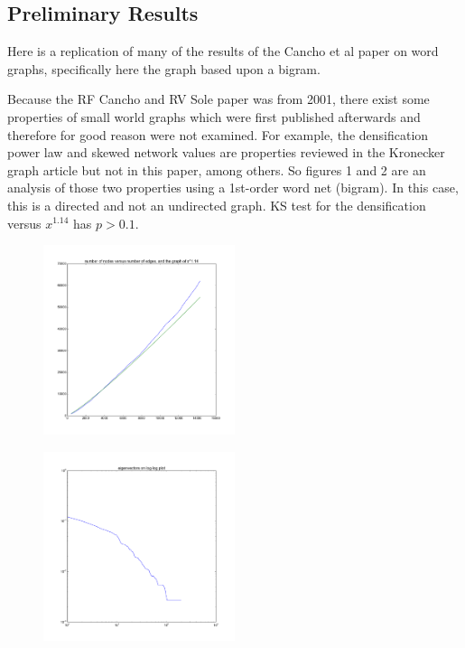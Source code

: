 \documentclass[12pt]{article}
\begin{document}
\subsection{Preliminary Results}

Here is a replication of many of the results of the Cancho et al paper on word graphs, specifically here the graph based upon a bigram. %

Because the RF Cancho and RV Sole paper was from 2001, there exist some properties of small world graphs which were first published afterwards and therefore for good reason were not examined. For example, the densification power law\cite{densificationpowerlaw} and skewed network values\cite{netvalskew} are properties reviewed in the Kronecker graph article but not in this paper, among others. So figures 1 and 2 are an analysis of those two properties using a 1st-order word net (bigram). In this case, this is a directed and not an undirected graph. KS test for the densification versus $x^{1.14}$ has $p>0.1$.

\begin{figure}
  \includegraphics[width=0.5\textwidth]{densification_plot.png}
\end{figure}

\begin{figure}
  \includegraphics[width=0.5\textwidth]{eigenvector_loglog.png}
\end{figure}
\end{document}
